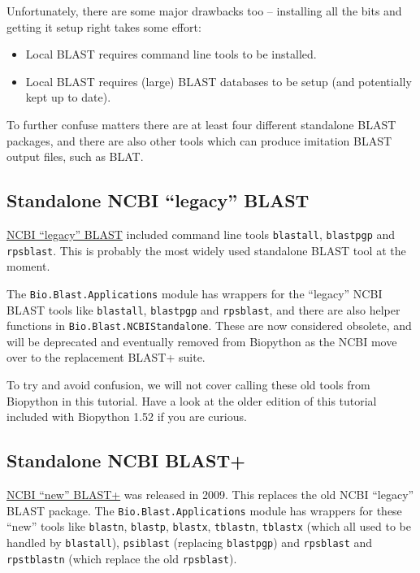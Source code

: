 \documentclass{report}
\begin{document}
Unfortunately, there are some major drawbacks too -- installing all the bits and getting
it setup right takes some effort:
\begin{itemize}
\item Local BLAST requires command line tools to be installed.
\item Local BLAST requires (large) BLAST databases to be setup (and potentially kept up to date).
\end{itemize}

\noindent
To further confuse matters there are at least four different standalone BLAST packages,
and there are also other tools which can produce imitation BLAST output files, such as BLAT.

\subsection{Standalone NCBI ``legacy'' BLAST}

\href{http://blast.ncbi.nlm.nih.gov/Blast.cgi?CMD=Web&PAGE_TYPE=BlastDocs&DOC_TYPE=Download}
{NCBI ``legacy'' BLAST} included command line tools \verb|blastall|, \verb|blastpgp| and
\verb|rpsblast|. This is probably the most widely used standalone BLAST tool at the moment.

The \verb|Bio.Blast.Applications| module has wrappers for the ``legacy'' NCBI BLAST tools
like \verb|blastall|, \verb|blastpgp| and \verb|rpsblast|, and there are also helper
functions in \verb|Bio.Blast.NCBIStandalone|. These are now considered obsolete, and will
be deprecated and eventually removed from Biopython as the NCBI move over to the replacement
BLAST+ suite.

To try and avoid confusion, we will not cover calling these old tools from Biopython
in this tutorial. Have a look at the older edition of this tutorial included with
Biopython 1.52 if you are curious.

\subsection{Standalone NCBI BLAST+}

\href{http://blast.ncbi.nlm.nih.gov/Blast.cgi?CMD=Web&PAGE_TYPE=BlastDocs&DOC_TYPE=Download}
{NCBI ``new'' BLAST+} was released in 2009. This replaces the old NCBI ``legacy'' BLAST
package. The \verb|Bio.Blast.Applications| module has wrappers for these ``new'' tools
like \verb|blastn|, \verb|blastp|, \verb|blastx|, \verb|tblastn|, \verb|tblastx|
(which all used to be handled by \verb|blastall|), \verb|psiblast|
(replacing \verb|blastpgp|) and \verb|rpsblast| and \verb|rpstblastn|
(which replace the old \verb|rpsblast|).
\end{document}
